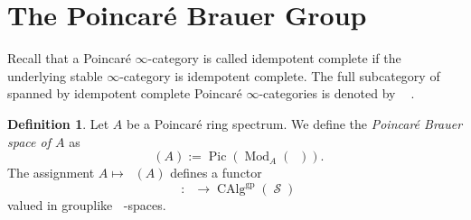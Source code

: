 \documentclass{article}
\DeclareMathOperator{\Brp}{Br^p} %
\DeclareMathOperator{\CAlg}{CAlg} %
\DeclareMathOperator{\CAlgp}{CAlg^p} %
\DeclareMathOperator{\Catp}{Cat^p_\infty} %
\DeclareMathOperator{\Catpidem}{Cat^p_{\infty, idem}} %
\DeclareMathOperator{\Einfty}{\mathbf{E}_\infty} %
\DeclareMathOperator{\gp}{gp} %
\DeclareMathOperator{\Mod}{Mod} %
\DeclareMathOperator{\Pic}{Pic} %
\DeclareMathOperator{\Spaces}{\mathcal{S}} %
\theoremstyle{definition}
\newtheorem{definition}[equation]{Definition}
\begin{document}
\section{The Poincaré Brauer Group}
\label{subsection:the_poincare_brauer_group}

Recall that a Poincaré $\infty$-category is called idempotent complete if the underlying stable $\infty$-category is idempotent complete. The full subcategory of $\Catp$ spanned by idempotent complete Poincaré $\infty$-categories is denoted by $\Catpidem$ \cite[Definition 1.3.2]{CDHHLMNNSII}.

\begin{definition}
    \label{definition:poincare_brauer_space}
    Let $A$ be a Poincaré ring spectrum. We define the \emph{Poincaré Brauer space of $A$} as $$\Brp(A):=\Pic(\Mod_A(\Catpidem)).$$
    The assignment $ A \mapsto \Brp(A) $ defines a functor
    \begin{equation*}
        \Brp \colon \CAlgp \to \CAlg^{\gp}(\Spaces)
    \end{equation*}
    valued in grouplike $ \Einfty $-spaces. 
\end{definition}
\end{document}
